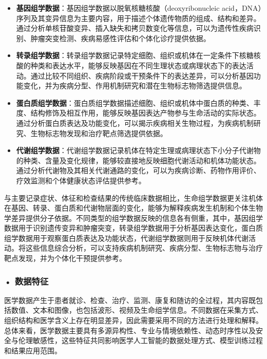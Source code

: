 \begin{itemize}
\item
  \textbf{基因组学数据}：基因组学数据以脱氧核糖核酸（deoxyribonucleic acid，DNA）序列及其变异信息为主要内容，用于描述个体遗传物质的组成、结构和差异。通过分析单核苷酸变异、插入缺失和拷贝数变化等信息，可以为遗传性疾病识别、肿瘤突变检测、疾病易感性评估和个体化诊疗提供依据。

\item
  \textbf{转录组学数据}：转录组学数据记录特定细胞、组织或机体在一定条件下核糖核酸的种类和表达水平，能够反映基因在不同生理状态或病理状态下的表达活动。通过比较不同组织、疾病阶段或干预条件下的表达差异，可以分析基因功能变化，并为疾病分型、作用机制研究和潜在生物标志物筛选提供信息。

\item
  \textbf{蛋白质组学数据}：蛋白质组学数据描述细胞、组织或机体中蛋白质的种类、丰度、结构修饰及相互作用，能够反映基因表达产物参与生命活动的实际状态。通过分析蛋白质表达及功能变化，可以揭示疾病相关生物过程，为疾病机制研究、生物标志物发现和治疗靶点筛选提供依据。

\item
  \textbf{代谢组学数据}：代谢组学数据记录机体在特定生理或病理状态下小分子代谢物的种类、含量及变化规律，能够较直接地反映细胞代谢活动和机体功能状态。通过分析代谢物及其相关代谢通路的变化，可以为疾病诊断、药物作用评价、疗效监测和个体健康状态评估提供参考。
\end{itemize}

与主要记录症状、体征和检查结果的传统临床数据相比，生命组学数据更关注机体在基因、转录、蛋白质和代谢物层面的变化，能够为解释疾病发生机制和个体生物学差异提供分子依据。不同类型的组学数据反映的信息各有侧重，其中，基因组学数据用于识别遗传变异和肿瘤突变，转录组学数据用于分析基因表达变化，蛋白质组学数据用于观察蛋白质表达及功能状态，代谢组学数据则用于反映机体代谢活动。将这些信息综合分析，可以支持疾病机制研究、疾病分型、生物标志物与治疗靶点发现，并为个体化干预提供参考。

\subsubsection*{\textbf{• 数据特征}}

医学数据产生于患者就诊、检查、治疗、监测、康复和随访的全过程，其内容既包括数值、文本和图像，也包括波形、视频及生命组学信息。不同数据在采集方式、组织结构和医学含义上存在明显差异，因此需要采用不同的方法进行处理和解释。总体来看，医学数据主要具有多源异构性、专业与情境依赖性、动态时序性以及安全与伦理敏感性，这些特征共同影响医学人工智能的数据处理方式、模型训练过程和结果应用范围。

